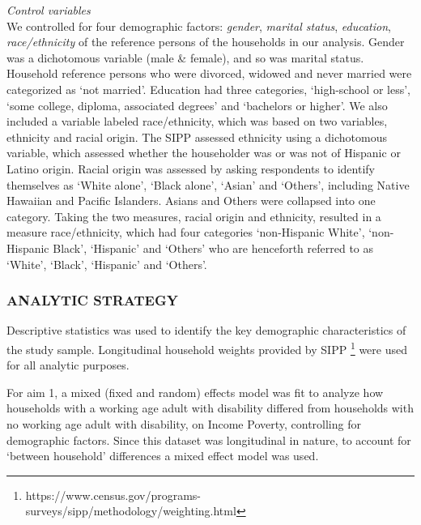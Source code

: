 \documentclass[11pt]{extarticle} %
\begin{document}
\noindent
{\emph{Control variables}}\\
We controlled for four demographic factors: {\emph{gender}}, {\emph{marital status}}, {\emph{education}}, {\emph{race/ethnicity}} of the reference persons of the households in our analysis. Gender was a dichotomous variable (male \& female), and so was marital status. Household reference persons who were divorced, widowed and never married were categorized as `not
married'. Education had three categories, `high-school or less', `some college, diploma, associated degrees' and `bachelors or higher'. We also included a variable labeled race/ethnicity, which was
based on two variables, ethnicity and racial origin. The SIPP assessed ethnicity using a dichotomous variable, which assessed whether the householder was or was not of Hispanic or
Latino origin. Racial origin was assessed by asking respondents to identify themselves as `White alone', `Black alone', `Asian' and `Others', including Native Hawaiian and Pacific Islanders. Asians
and Others were collapsed into one category. Taking the two measures, racial origin and ethnicity, resulted in a measure race/ethnicity, which had four categories `non-Hispanic White', `non-Hispanic Black', `Hispanic' and `Others' who are henceforth referred to as `White', `Black', `Hispanic' and `Others'. 

\subsubsection*{ANALYTIC STRATEGY}
Descriptive statistics was used to identify the key demographic characteristics of the study sample. Longitudinal household weights provided by SIPP \footnote{https://www.census.gov/programs-surveys/sipp/methodology/weighting.html} were used for all analytic purposes. 

For aim 1, a mixed (fixed and random) effects model was fit to analyze how households with a working age adult with disability differed from households with no working age adult with disability, on Income Poverty, controlling for demographic factors. Since this dataset was longitudinal in nature, to account for `between household' differences a mixed effect model was used. 
\end{document}
